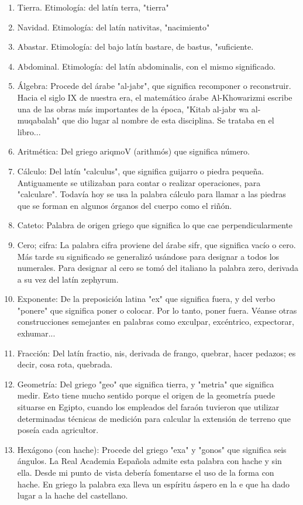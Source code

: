 \documentclass{mylib/reporte}
\begin{document}
\begin{enumerate}
	\item Tierra. Etimología: del latín terra, "tierra"
	\item Navidad. Etimología: del latín nativitas, "nacimiento"
	\item Abastar. Etimología: del bajo latín bastare, de bastus, "suficiente.
	\item Abdominal. Etimología: del latín abdominalis, con el mismo significado.
	\item Álgebra: Procede del árabe "al-jabr", que significa recomponer o reconstruir. Hacia el siglo IX de nuestra era, el matemático árabe Al-Khowarizmi escribe una de las obras más importantes de la época, "Kitab al-jabr wa al-muqabalah" que dio lugar al nombre de esta disciplina. Se trataba en el libro...
	\item Aritmética: Del griego ariqmoV (arithmós) que significa número.
	\item Cálculo: Del latín "calculus", que significa guijarro o piedra pequeña. Antiguamente se utilizaban para contar o realizar operaciones, para "calculare". Todavía hoy se usa la palabra cálculo para llamar a las piedras que se forman en algunos órganos del cuerpo como el riñón.
	\item Cateto: Palabra de origen griego que significa lo que cae perpendicularmente
	\item Cero; cifra: La palabra cifra proviene del árabe sifr, que significa vacío o cero. Más tarde su significado se generalizó usándose para designar a todos los numerales. Para designar al cero se tomó del italiano la palabra zero, derivada a su vez del latín zephyrum.
	\item Exponente: De la preposición latina "ex" que significa fuera, y del verbo "ponere" que significa poner o colocar. Por lo tanto, poner fuera. Véanse otras construcciones semejantes en palabras como exculpar, excéntrico, expectorar, exhumar...
	\item Fracción: Del latín fractio, nis, derivada de frango, quebrar, hacer pedazos; es decir, cosa rota, quebrada.
	\item Geometría: Del griego "geo" que significa tierra, y "metria" que significa medir. Esto tiene mucho sentido porque el origen de la geometría puede situarse en Egipto, cuando los empleados del faraón tuvieron que utilizar determinadas técnicas de medición para calcular la extensión de terreno que poseía cada agricultor.
	\item Hexágono (con hache): Procede del griego "exa" y "gonos" que significa seis ángulos. La Real Academia Española admite esta palabra con hache y sin ella. Desde mi punto de vista debería fomentarse el uso de la forma con hache. En griego la palabra exa lleva un espíritu áspero en la e que ha dado lugar a la hache del castellano.

\end{enumerate}
\end{document}
